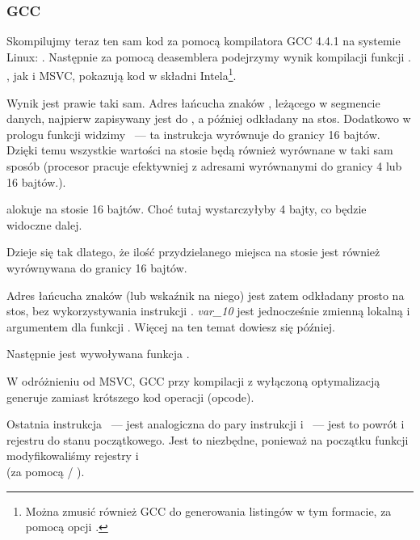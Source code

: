 \subsubsection{GCC}

Skompilujmy teraz ten sam kod za pomocą kompilatora GCC 4.4.1 na systemie Linux: .
Następnie za pomocą deasemblera \IDA podejrzymy wynik kompilacji funkcji \main.
\IDA, jak i MSVC, pokazują kod w składni Intela\footnote{Można zmusić również GCC do generowania listingów w tym formacie, za pomocą opcji .}.



Wynik jest prawie taki sam.
Adres łańcucha znaków , leżącego w segmencie danych, najpierw zapisywany jest do \EAX, a później odkładany na stos.
Dodatkowo w prologu funkcji widzimy ~---
ta instrukcja wyrównuje \ESP do granicy 16 bajtów.
Dzięki temu wszystkie wartości na stosie będą również wyrównane w taki sam sposób (procesor pracuje efektywniej z adresami wyrównanymi do granicy 4 lub 16 bajtów.).

 alokuje na stosie 16 bajtów. Choć tutaj wystarczyłyby 4 bajty, co będzie widoczne dalej.

Dzieje się tak dlatego, że ilość przydzielanego miejsca na stosie jest również wyrównywana do granicy 16 bajtów.

Adres łańcucha znaków (lub wskaźnik na niego) jest zatem odkładany prosto na stos, bez wykorzystywania instrukcji \PUSH.
\emph{var\_10} jest jednocześnie zmienną lokalną i argumentem dla funkcji \printf{}.
Więcej na ten temat dowiesz się później.

Następnie jest wywoływana funkcja \printf.

W odróżnieniu od MSVC, GCC przy kompilacji z wyłączoną optymalizacją generuje  zamiast krótszego kod operacji (opcode).

Ostatnia instrukcja \LEAVE~--- jest analogiczna do pary instrukcji   i ~--- jest to powrót  i rejestru \EBP do stanu początkowego.
Jest to niezbędne, ponieważ na początku funkcji modyfikowaliśmy rejestry \ESP i \EBP\\
(za pomocą  / ).

